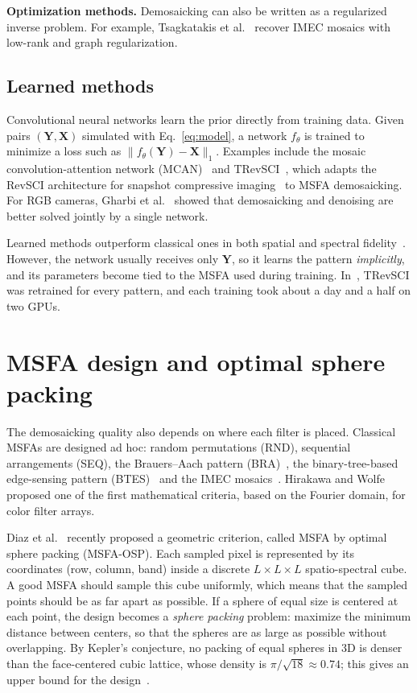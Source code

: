 \documentclass{article}
\def\X{{\mathbf X}}
\def\Y{{\mathbf Y}}
\begin{document}
\textbf{Optimization methods.} Demosaicking can also be written as a
regularized inverse problem. For example, Tsagkatakis et
al.~\cite{tsagkatakis2019} recover IMEC mosaics with low-rank and graph
regularization.

\subsection{Learned methods}

Convolutional neural networks learn the prior directly from training data.
Given pairs $(\Y,\X)$ simulated with Eq.~\eqref{eq:model}, a network
$f_\theta$ is trained to minimize a loss such as
$\|f_\theta(\Y)-\X\|_1$. Examples include the mosaic convolution-attention
network (MCAN)~\cite{feng2021} and TRevSCI~\cite{diaz2023}, which adapts the
RevSCI architecture for snapshot compressive imaging~\cite{cheng2021} to MSFA
demosaicking. For RGB cameras, Gharbi et al.~\cite{gharbi2016} showed that
demosaicking and denoising are better solved jointly by a single network.

Learned methods outperform classical ones in both spatial and spectral
fidelity~\cite{diaz2023}. However, the network usually receives only $\Y$, so
it learns the pattern \emph{implicitly}, and its parameters become tied to
the MSFA used during training. In~\cite{diaz2023}, TRevSCI was retrained for
every pattern, and each training took about a day and a half on two GPUs.

\section{MSFA design and optimal sphere packing}
\label{sec:design}

The demosaicking quality also depends on where each filter is placed.
Classical MSFAs are designed ad hoc: random permutations (RND), sequential
arrangements (SEQ), the Brauers--Aach pattern (BRA)~\cite{brauers2006},
the binary-tree-based edge-sensing pattern (BTES)~\cite{miao2006} and the IMEC
mosaics~\cite{geelen2014}. Hirakawa and Wolfe~\cite{hirakawa2008} proposed
one of the first mathematical criteria, based on the Fourier domain, for color
filter arrays.

Diaz et al.~\cite{diaz2023} recently proposed a geometric criterion, called
MSFA by optimal sphere packing (MSFA-OSP). Each sampled pixel is represented
by its coordinates (row, column, band) inside a discrete
$L\times L\times L$ spatio-spectral cube. A good MSFA should sample this cube
uniformly, which means that the sampled points should be as far apart as
possible. If a sphere of equal size is centered at each point, the design
becomes a \emph{sphere packing} problem: maximize the minimum distance
between centers, so that the spheres are as large as possible without
overlapping. By Kepler's conjecture, no packing of equal spheres in 3D is
denser than the face-centered cubic lattice, whose density is
$\pi/\sqrt{18}\approx0.74$; this gives an upper bound for the
design~\cite{diaz2023}.
\end{document}
